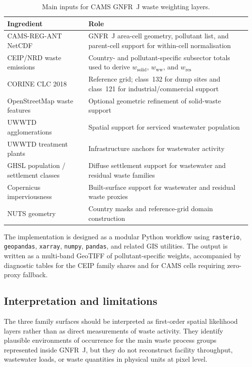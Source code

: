 \begin{table}[htbp]
  \centering
  \caption{Main inputs for CAMS GNFR~J waste weighting layers.}
  \label{tab:waste_inputs}
  \begin{tabular}{p{3.4cm}p{9.3cm}}
    \hline
    Ingredient & Role \\
    \hline
    CAMS-REG-ANT NetCDF & GNFR~J area-cell geometry, pollutant list, and parent-cell support for within-cell normalisation \\
    CEIP/NRD waste emissions & Country- and pollutant-specific subsector totals used to derive $w_{\mathrm{solid}}$, $w_{\mathrm{ww}}$, and $w_{\mathrm{res}}$ \\
    CORINE CLC 2018 & Reference grid; class~132 for dump sites and class~121 for industrial/commercial support \\
    OpenStreetMap waste features & Optional geometric refinement of solid-waste support \\
    UWWTD agglomerations & Spatial support for serviced wastewater population \\
    UWWTD treatment plants & Infrastructure anchors for wastewater activity \\
    GHSL population / settlement classes & Diffuse settlement support for wastewater and residual waste families \\
    Copernicus imperviousness & Built-surface support for wastewater and residual waste proxies \\
    NUTS geometry & Country masks and reference-grid domain construction \\
    \hline
  \end{tabular}
\end{table}

The implementation is designed as a modular Python workflow using
\texttt{rasterio}, \texttt{geopandas}, \texttt{xarray},
\texttt{numpy}, \texttt{pandas}, and related GIS utilities. The output
is written as a multi-band GeoTIFF of pollutant-specific weights,
accompanied by diagnostic tables for the CEIP family shares and for
CAMS cells requiring zero-proxy fallback.

\subsection{Interpretation and limitations}

The three family surfaces should be interpreted as first-order spatial
likelihood layers rather than as direct measurements of waste activity.
They identify plausible environments of occurrence for the main waste
process groups represented inside GNFR~J, but they do not reconstruct
facility throughput, wastewater loads, or waste quantities in physical
units at pixel level.

